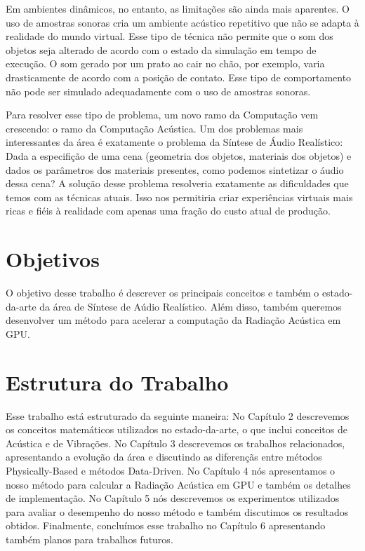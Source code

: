 Em ambientes dinâmicos, no entanto, as limitações são ainda mais aparentes. O uso de amostras sonoras cria um ambiente acústico repetitivo que não se adapta à realidade do mundo virtual. Esse tipo de técnica não permite que o som dos objetos seja alterado de acordo com o estado da simulação em tempo de execução. O som gerado por um prato ao cair no chão, por exemplo, varia drasticamente de acordo com a posição de contato. Esse tipo de comportamento não pode ser simulado adequadamente com o uso de amostras sonoras.

Para resolver esse tipo de problema, um novo ramo da Computação vem crescendo: o ramo da Computação Acústica. Um dos problemas mais interessantes da área é exatamente o problema da Síntese de Áudio Realístico: Dada a especifição de uma cena (geometria dos objetos, materiais dos objetos) e dados os parâmetros dos materiais presentes, como podemos sintetizar o áudio dessa cena? A solução desse problema resolveria exatamente as dificuldades que temos com as técnicas atuais. Isso nos permitiria criar experiências virtuais mais ricas e fiéis à realidade com apenas uma fração do custo atual de produção. 

\section{Objetivos}

O objetivo desse trabalho é descrever os principais conceitos e também o estado-da-arte da área de Síntese de Aúdio Realístico. Além disso, também queremos desenvolver um método para acelerar a computação da Radiação Acústica em GPU.

\section{Estrutura do Trabalho}

Esse trabalho está estruturado da seguinte maneira: No Capítulo 2 descrevemos os conceitos matemáticos utilizados no estado-da-arte, o que inclui conceitos de Acústica e de Vibrações. No Capítulo 3 descrevemos os trabalhos relacionados, apresentando a evolução da área e discutindo as diferençãs entre métodos Physically-Based e métodos Data-Driven. No Capítulo 4 nós apresentamos o nosso método para calcular a Radiação Acústica em GPU e também os detalhes de implementação. No Capítulo 5 nós descrevemos os experimentos utilizados para avaliar o desempenho do nosso método e também discutimos os resultados obtidos. Finalmente, concluímos esse trabalho no Capítulo 6 apresentando também planos para trabalhos futuros.
